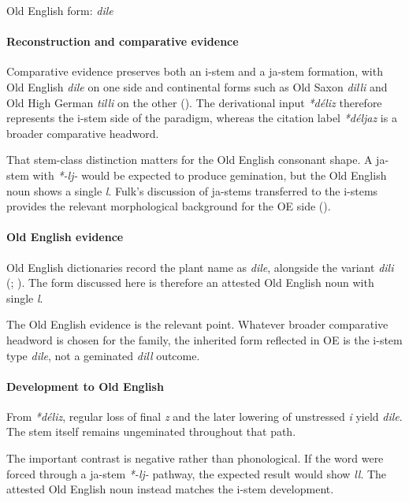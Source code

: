 \documentclass[
  british,
  a4paper,
]{article}
\begin{document}
Old English form: \emph{dile}

\paragraph{Reconstruction and comparative
evidence}\label{reconstruction-and-comparative-evidence-8}

Comparative evidence preserves both an i-stem and a ja-stem formation,
with Old English \emph{dile} on one side and continental forms such as
Old Saxon \emph{dilli} and Old High German \emph{tilli} on the other
(). The derivational input
\emph{*déliz} therefore represents the i-stem side of the paradigm,
whereas the citation label \emph{*déljaz} is a broader comparative
headword.

That stem-class distinction matters for the Old English consonant shape.
A ja-stem with \emph{*-lj-} would be expected to produce gemination, but
the Old English noun shows a single \emph{l}. Fulk's discussion of
ja-stems transferred to the i-stems provides the relevant morphological
background for the OE side ().

\paragraph{Old English evidence}\label{old-english-evidence-8}

Old English dictionaries record the plant name as \emph{dile}, alongside
the variant \emph{dili} (; ).
The form discussed here is therefore an attested Old English noun with
single \emph{l}.

The Old English evidence is the relevant point. Whatever broader
comparative headword is chosen for the family, the inherited form
reflected in OE is the i-stem type \emph{dile}, not a geminated
\emph{dill} outcome.

\paragraph{Development to Old
English}\label{development-to-old-english-8}

From \emph{*déliz}, regular loss of final \emph{z} and the later
lowering of unstressed \emph{i} yield \emph{dile}. The stem itself
remains ungeminated throughout that path.

The important contrast is negative rather than phonological. If the word
were forced through a ja-stem \emph{*-lj-} pathway, the expected result
would show \emph{ll}. The attested Old English noun instead matches the
i-stem development.
\end{document}
